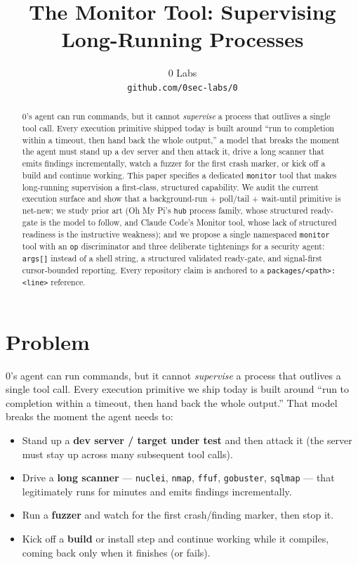 \documentclass[11pt]{article}
\title{The Monitor Tool: Supervising Long-Running Processes}
\author{
  0 Labs \\
  \texttt{github.com/0sec-labs/0}
}
\date{}
\begin{document}
\maketitle

\begin{abstract}
0's agent can run commands, but it cannot \textit{supervise} a process that
outlives a single tool call. Every execution primitive shipped today is built
around ``run to completion within a timeout, then hand back the whole output,'' a
model that breaks the moment the agent must stand up a dev server and then attack
it, drive a long scanner that emits findings incrementally, watch a fuzzer for
the first crash marker, or kick off a build and continue working. This paper
specifies a dedicated \texttt{monitor} tool that makes long-running supervision a
first-class, structured capability. We audit the current execution surface and
show that a background-run + poll/tail + wait-until primitive is net-new; we
study prior art (Oh My Pi's \texttt{hub} process family, whose structured
ready-gate is the model to follow, and Claude Code's Monitor tool, whose lack of
structured readiness is the instructive weakness); and we propose a single
namespaced \texttt{monitor} tool with an \texttt{op} discriminator and three
deliberate tightenings for a security agent: \texttt{args[]} instead of a shell
string, a structured validated ready-gate, and signal-first cursor-bounded
reporting. Every repository claim is anchored to a
\texttt{packages/<path>:<line>} reference.
\end{abstract}

\section{Problem}

0's agent can run commands, but it cannot \textit{supervise} a process that
outlives a single tool call. Every execution primitive we ship today is built
around ``run to completion within a timeout, then hand back the whole output.''
That model breaks the moment the agent needs to:

\begin{itemize}[leftmargin=*]
  \item Stand up a \textbf{dev server / target under test} and then attack it
  (the server must stay up across many subsequent tool calls).
  \item Drive a \textbf{long scanner} --- \texttt{nuclei}, \texttt{nmap},
  \texttt{ffuf}, \texttt{gobuster}, \texttt{sqlmap} --- that legitimately runs for
  minutes and emits findings incrementally.
  \item Run a \textbf{fuzzer} and watch for the first crash/finding marker, then
  stop it.
  \item Kick off a \textbf{build} or install step and continue working while it
  compiles, coming back only when it finishes (or fails).
\end{itemize}
\end{document}
